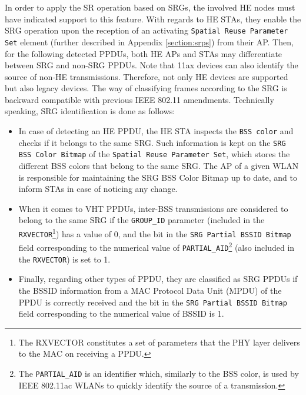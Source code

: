 \documentclass[comsoc]{IEEEtran}
\begin{document}
	In order to apply the SR operation based on SRGs, the involved HE nodes must have indicated support to this feature. With regards to HE STAs, they enable the SRG operation upon the reception of an activating \texttt{Spatial Reuse Parameter Set} element (further described in Appendix \ref{section:srps}) from their AP. Then, for the following detected PPDUs, both HE APs and STAs may differentiate between SRG and non-SRG PPDUs. Note that 11ax devices can also identify the source of non-HE transmissions. Therefore, not only HE devices are supported but also legacy devices. The way of classifying frames according to the SRG is backward compatible with previous IEEE 802.11 amendments. Technically speaking, SRG identification is done as follows:
	\begin{itemize}
		\item In case of detecting an HE PPDU, the HE STA inspects the \texttt{BSS color} and checks if it belongs to the same SRG. Such information is kept on the \texttt{SRG BSS Color Bitmap} of the \texttt{Spatial Reuse Parameter Set}, which stores the different BSS colors that belong to the same SRG. The AP of a given WLAN is responsible for maintaining the SRG BSS Color Bitmap up to date, and to inform STAs in case of noticing any change.
		\item When it comes to VHT PPDUs, inter-BSS transmissions are considered to belong to the same SRG if the \texttt{GROUP\_ID} parameter (included in the \texttt{RXVECTOR}\footnote{The RXVECTOR constitutes a set of parameters that the PHY layer delivers to the MAC on receiving a PPDU.}) has a value of 0, and the bit in the \texttt{SRG Partial BSSID Bitmap} field corresponding to the numerical value of \texttt{PARTIAL\_AID}\footnote{The \texttt{PARTIAL\_AID} is an identifier which, similarly to the BSS color, is used by IEEE 802.11ac WLANs to quickly identify the source of a transmission.} (also included in the \texttt{RXVECTOR}) is set to 1. 
		\item Finally, regarding other types of PPDU, they are classified as SRG PPDUs if the BSSID information from a MAC Protocol Data Unit (MPDU) of the PPDU is correctly received and the bit in the \texttt{SRG Partial BSSID Bitmap} field corresponding to the numerical value of BSSID is 1.
	\end{itemize}
	
\end{document}
